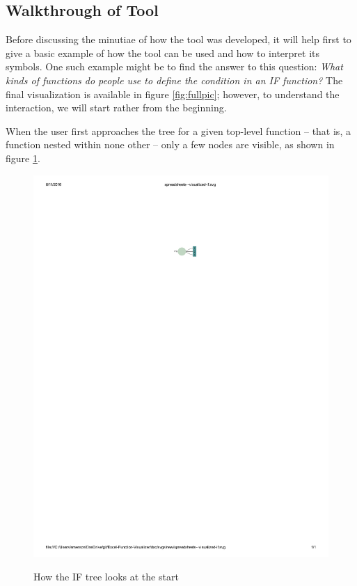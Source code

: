 \documentclass[conference]{IEEEtran}
\begin{document}
	\subsection{Walkthrough of Tool} Before discussing the minutiae of how the tool
	was developed, it will help first to give a basic example of how the tool can
	be used and how to interpret its symbols. One such example might be to find the
	answer to this question: \textit{ What kinds of functions do people use to
		define the condition in an IF function?} The final visualization is available
	in figure \ref{fig:fullpic}; however, to understand the interaction, we will
	start rather from the beginning. \par
	
	When the user first approaches the tree for a given top-level function -- that
	is, a function nested within none other -- only a few nodes are visible, as
	shown in figure \ref{fig:startpic}. \par
	
	\begin{figure} \centering \includegraphics{start} \label{fig:startpic}
		\caption{How the IF tree looks at the start} \end{figure}
	
\end{document}
